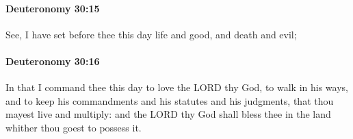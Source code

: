 		\paragraph{Deuteronomy 30:15} %
			\label{DEUTERONOMY-30-15}

			See, I have set before thee this day life and good, and death and evil;


		\paragraph{Deuteronomy 30:16} %
			\label{DEUTERONOMY-30-16}

			In that I command thee this day to love the LORD thy God, to walk in his ways, and to keep his commandments and his statutes and his judgments, that thou mayest live and multiply: and the LORD thy God shall bless thee in the land whither thou goest to possess it.


